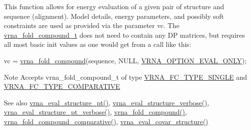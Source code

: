 This function allows for energy evaluation of a given pair of structure and sequence (alignment). Model details, energy parameters, and possibly soft constraints are used as provided via the parameter \textquotesingle{}vc\textquotesingle{}. The \hyperlink{group__fold__compound_ga1b0cef17fd40466cef5968eaeeff6166}{vrna\+\_\+fold\+\_\+compound\+\_\+t} does not need to contain any DP matrices, but requires all most basic init values as one would get from a call like this\+: 
\begin{DoxyCode}
vc = \hyperlink{group__fold__compound_ga6601d994ba32b11511b36f68b08403be}{vrna\_fold\_compound}(sequence, NULL, \hyperlink{group__fold__compound_ga61469c423131552c8483229f8b6c7e0e}{VRNA\_OPTION\_EVAL\_ONLY});
\end{DoxyCode}


\begin{DoxyNote}{Note}
Accepts vrna\+\_\+fold\+\_\+compound\+\_\+t of type \hyperlink{group__fold__compound_gga01a4ff86fa71deaaa5d1abbd95a1447da7e264dd3cf2dc9b6448caabcb7763cd6}{V\+R\+N\+A\+\_\+\+F\+C\+\_\+\+T\+Y\+P\+E\+\_\+\+S\+I\+N\+G\+LE} and \hyperlink{group__fold__compound_gga01a4ff86fa71deaaa5d1abbd95a1447dab821ce46ea3cf665be97df22a76f5023}{V\+R\+N\+A\+\_\+\+F\+C\+\_\+\+T\+Y\+P\+E\+\_\+\+C\+O\+M\+P\+A\+R\+A\+T\+I\+VE}
\end{DoxyNote}
\begin{DoxySeeAlso}{See also}
\hyperlink{group__eval_gadbd09372ddfd7a450bbd590c96a6bfe4}{vrna\+\_\+eval\+\_\+structure\+\_\+pt()}, \hyperlink{group__eval_ga0928d699d310178f84ee2351034e5cb5}{vrna\+\_\+eval\+\_\+structure\+\_\+verbose()}, \hyperlink{group__eval_ga8a517cfeeae8c376ae7b1e0c401d38b4}{vrna\+\_\+eval\+\_\+structure\+\_\+pt\+\_\+verbose()}, \hyperlink{group__fold__compound_ga6601d994ba32b11511b36f68b08403be}{vrna\+\_\+fold\+\_\+compound()}, \hyperlink{group__fold__compound_gad6bacc816af274922b13d947f708aa0c}{vrna\+\_\+fold\+\_\+compound\+\_\+comparative()}, \hyperlink{group__eval_ga6cea75c0eb9857fb59172be54cab09e0}{vrna\+\_\+eval\+\_\+covar\+\_\+structure()}
\end{DoxySeeAlso}

